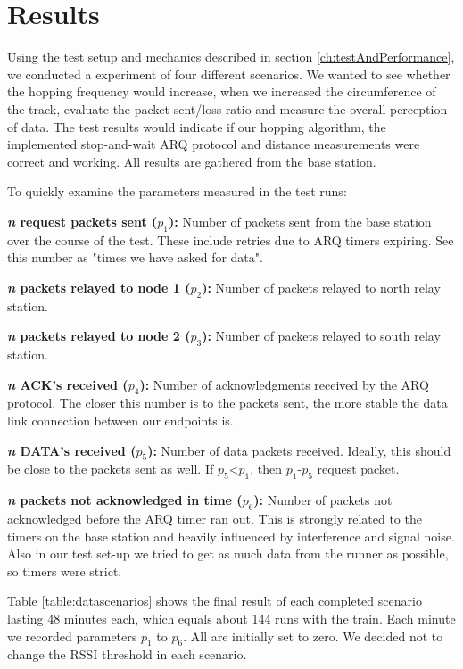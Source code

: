 \chapter{Results}\label{ch:results}

Using the test setup and mechanics described in section \ref{ch:testAndPerformance}, we conducted a experiment of four different scenarios. We wanted to see whether the hopping frequency would increase, when we increased the circumference of the track, evaluate the packet sent/loss ratio and measure the overall perception of data. The test results would indicate if our hopping algorithm, the implemented stop-and-wait ARQ protocol and distance measurements were correct and working. All results are gathered from the base station.

\noindent To quickly examine the parameters measured in the test runs:

\noindent \textbf{\textit{n} request packets sent ($p_1$):} Number of packets sent from the base station over the course of the test. These include retries due to ARQ timers expiring. See this number as "times we have asked for data".

\noindent \textbf{\textit{n} packets relayed to node 1 ($p_2$):} Number of packets relayed to north relay station.

\noindent \textbf{\textit{n} packets relayed to node 2 ($p_3$):} Number of packets relayed to south relay station.

\noindent \textbf{\textit{n} ACK's received ($p_4$):} Number of acknowledgments received by the ARQ protocol. The closer this number is to the packets sent, the more stable the data link connection between our endpoints is.

\noindent \textbf{\textit{n} DATA's received ($p_5$):} Number of data packets received. Ideally, this should be close to the packets sent as well. If $p_5$<$p_1$, then $p_1$-$p_5$ request packet.

\noindent \textbf{\textit{n} packets not acknowledged in time ($p_6$):} Number of packets not acknowledged before the ARQ timer ran out. This is strongly related to the timers on the base station and heavily influenced by interference and signal noise. Also in our test set-up we tried to get as much data from the runner as possible, so timers were strict.

\noindent Table \ref{table:datascenarios} shows the final result of each completed scenario lasting 48 minutes each, which equals about 144 runs with the train. Each minute we recorded parameters $p_1$ to $p_6$. All are initially set to zero. We decided not to change the RSSI threshold in each scenario.

